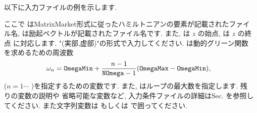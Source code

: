 \documentclass[letterpaper,10pt,dvipdfmx,openany]{sphinxmanual}
\begin{document}
以下に入力ファイルの例を示します.

\begin{sphinxVerbatim}[commandchars=\\\{\}]
    
    
  
  
  
  
  
    
    
    
    
     
      
    
\end{sphinxVerbatim}

ここで
 はMatrixMarket形式に従ったハミルトニアンの要素が記載されたファイル名,
 は励起ベクトルが記載されたファイル名です. また,
 は \(z\) の始点,
 は \(z\) の終点 に対応します.
"(実部,虚部)"の形式で入力してください.
 は動的グリーン関数を求めるための周波数
\begin{equation*}
\begin{split}\begin{align}
\omega_n =  {\tt OmegaMin}
+ \frac{n-1}{{\tt NOmega}-1}({\tt OmegaMax} - {\tt OmegaMin}),
\end{align}\end{split}
\end{equation*}
(\(n=1\cdots\) )を指定するための変数です.
また,   はループの最大数を指定します.  残りの変数の説明や
省略可能な変数など, 入力条件ファイルの詳細はSec.
{\hyperref[\detokenize{shiftk_format_ja:modpara}]{}} を参照してください.
また文字列変数は \sphinxcode{\sphinxupquote{\textquotesingle{}}} もしくは  で囲ってください.
\end{document}

